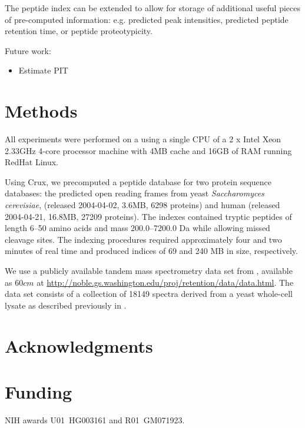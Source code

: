 \documentclass[12pt]{article}
\begin{document}
The peptide index can be extended to allow for
storage of additional useful pieces of pre-computed information: 
e.g.  predicted peak intensities, predicted peptide retention time,
or peptide proteotypicity.  %

Future work:
\begin{itemize}

\item Estimate PIT

\end{itemize}

\section{Methods}

All experiments were performed on a 
using a single CPU of a 2 x Intel Xeon 2.33GHz 4-core processor machine
with 4MB cache and 16GB of RAM running RedHat Linux.

Using Crux, we precomputed a peptide database for two protein sequence databases: the predicted open reading 
frames from yeast {\em Saccharomyces cerevisiae},
(released 2004-04-02, 3.6MB, 6298 proteins) 
and human (released 2004-04-21, 16.8MB, 27209 proteins).
The indexes contained tryptic peptides of
length 6--50 amino acids and mass 200.0--7200.0 Da 
while allowing missed cleavage sites.
The indexing procedures required approximately four and two 
minutes of real time and produced indices of 69 and 240 MB in size, 
respectively.

We use a publicly available tandem mass spectrometry data
set from \cite{klammer:peptide2}, available as $60cm$ at 
\url{http://noble.gs.washington.edu/proj/retention/data/data.html}.
The data set consists of a collection of 18149 spectra derived
from a yeast whole-cell lysate as described previously in 
\cite{klammer:peptide2}.

\section*{Acknowledgments}
\section*{Funding}
NIH awards U01~HG003161 and R01~GM071923.


 
\end{document}
